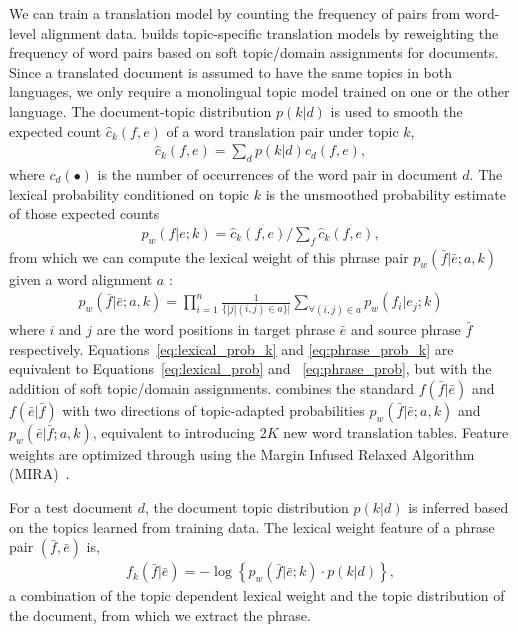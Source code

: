 We can train a translation model by counting the frequency of pairs from word-level alignment data.
\citet{Eidelman-12} builds topic-specific translation models by reweighting the frequency of word pairs based on soft topic/domain assignments for documents.
Since a translated document is assumed to have the same topics in both languages, we only require a monolingual topic model trained on one or the other language.
The document-topic distribution $p(k|d)$ is used
to smooth the expected count $\hat{c}_{k}(f,e)$ of a word translation
pair under topic $k$,
\begin{align}
\textstyle \hat{c}_{k}(f,e) = \sum_{d}{p(k|d)c_d(f,e)},
\end{align}
where $c_d(\bullet)$ is the number of occurrences of the word pair in
document $d$.  The lexical probability conditioned on topic $k$ is the
unsmoothed probability estimate of those expected counts
\begin{align}
\label{eq:lexical_prob_k}
\textstyle p_w(f|e;k) = \hat{c}_{k}(f,e) / \sum_f{\hat{c}_{k}(f,e)},
\end{align}
from which we can compute the lexical weight of this phrase pair
$p_w(\bar{f}|\bar{e};a, k)$ given a word alignment $a$ \citep{koehn-03}:
\begin{align}
\label{eq:phrase_prob_k}
p_w(\bar{f} | \bar{e};a, k) = \prod^{n}_{i=1} \frac{1}{\{|j | (i, j) \in a\}|} \sum_{\forall (i,j) \in a} p_w(f_i | e_j; k)
\end{align}
where $i$ and $j$ are the word positions in target phrase $\bar{e}$
and source phrase $\bar{f}$ respectively. 
Equations~\ref{eq:lexical_prob_k} and \ref{eq:phrase_prob_k} are equivalent to Equations~\ref{eq:lexical_prob} and ~\ref{eq:phrase_prob}, but with the addition of soft topic/domain assignments.
\citet{Eidelman-12} combines the standard $f(\bar{f}|\bar{e})$ and
$f(\bar{e}|\bar{f})$ with two directions of
topic-adapted probabilities 
$p_w(\bar{f} | \bar{e};a, k)$ and $p_w(\bar{e} | \bar{f};a, k)$, equivalent to introducing $2K$ new word translation tables. 
Feature weights are optimized through
using the Margin Infused Relaxed
  Algorithm (MIRA)~\cite[\textsc{mira}]{Crammer-06}.

For a test document $d$, the document topic distribution $p(k | d)$ is
inferred based on the topics learned from training data. The lexical
weight feature of a phrase pair $(\bar{f}, \bar{e})$ is,
\begin{align}
\textstyle f_{k}(\bar{f}|\bar{e})=-\log\left\{{p_{w}(\bar{f}|\bar{e};k)\cdot p(k|d)}\right\},
\end{align}
a combination of the topic dependent lexical weight and the topic
distribution of the document, from which we extract the phrase.

